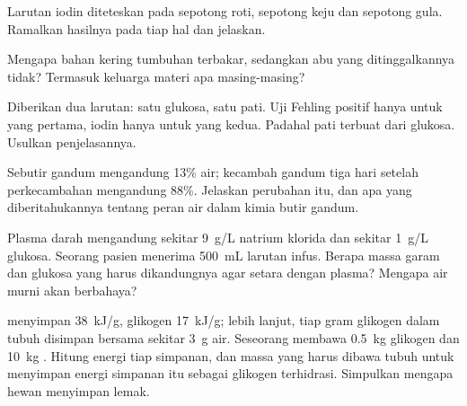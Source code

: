\begin{exercise}[$\star\star$]\label{exo:g10:chemistry-of-life:9}
Larutan iodin diteteskan pada sepotong roti, sepotong keju dan
sepotong gula. Ramalkan hasilnya pada tiap hal dan jelaskan.
\end{exercise}

\begin{exercise}[$\star\star$]\label{exo:g10:chemistry-of-life:10}
Mengapa bahan kering tumbuhan terbakar, sedangkan abu yang
ditinggalkannya tidak? Termasuk keluarga materi apa masing-masing?
\end{exercise}

\begin{exercise}[$\star\star$]\label{exo:g10:chemistry-of-life:11}
Diberikan dua larutan: satu glukosa, satu pati. Uji Fehling
positif hanya untuk yang pertama, iodin hanya untuk yang kedua. Padahal
pati terbuat dari glukosa. Usulkan penjelasannya.
\end{exercise}

\begin{exercise}[$\star\star\star$]\label{exo:g10:chemistry-of-life:12}
Sebutir gandum mengandung 13\% air; kecambah gandum tiga hari setelah
perkecambahan mengandung 88\%. Jelaskan perubahan itu, dan apa yang
diberitahukannya tentang peran air dalam kimia butir gandum.
\end{exercise}

\begin{exercise}[$\star\star\star$]\label{exo:g10:chemistry-of-life:13}
Plasma darah mengandung sekitar \qty{9}{g/L} natrium klorida dan sekitar
\qty{1}{g/L} glukosa. Seorang pasien menerima \qty{500}{mL} larutan
infus. Berapa massa garam dan glukosa yang harus dikandungnya agar
setara dengan plasma? Mengapa air murni akan berbahaya?
\end{exercise}

\begin{exercise}[$\star\star\star$]\label{exo:g10:chemistry-of-life:14}
 menyimpan \qty{38}{kJ/g}, glikogen \qty{17}{kJ/g}; lebih lanjut, tiap
gram glikogen dalam tubuh disimpan bersama sekitar \qty{3}{g} air.
Seseorang membawa \qty{0.5}{kg} glikogen dan \qty{10}{kg} .
Hitung energi tiap simpanan, dan massa yang harus dibawa tubuh untuk
menyimpan energi simpanan  itu sebagai glikogen terhidrasi. Simpulkan
mengapa hewan menyimpan lemak.
\end{exercise}

